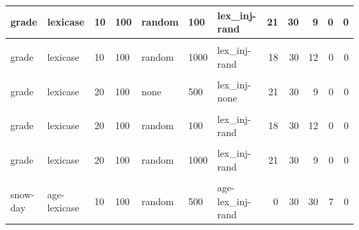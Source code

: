 \documentclass[
]{book}
\begin{document}
\begin{table}
\begin{tabular}{l|l|l|l|l|l|l|r|r|r|r|r}
\hline
grade & lexicase & 10 & 100 & random & 100 & lex\_inj-rand & 21 & 30 & 9 & 0 & 0\\
\hline
\cellcolor{gray!6}{grade} & \cellcolor{gray!6}{lexicase} & \cellcolor{gray!6}{10} & \cellcolor{gray!6}{100} & \cellcolor{gray!6}{random} & \cellcolor{gray!6}{500} & \cellcolor{gray!6}{lex\_inj-rand} & \cellcolor{gray!6}{23} & \cellcolor{gray!6}{30} & \cellcolor{gray!6}{7} & \cellcolor{gray!6}{0} & \cellcolor{gray!6}{0}\\
\hline
grade & lexicase & 10 & 100 & random & 1000 & lex\_inj-rand & 18 & 30 & 12 & 0 & 0\\
\hline
\cellcolor{gray!6}{grade} & \cellcolor{gray!6}{lexicase} & \cellcolor{gray!6}{20} & \cellcolor{gray!6}{100} & \cellcolor{gray!6}{none} & \cellcolor{gray!6}{100} & \cellcolor{gray!6}{lex\_inj-none} & \cellcolor{gray!6}{23} & \cellcolor{gray!6}{30} & \cellcolor{gray!6}{7} & \cellcolor{gray!6}{0} & \cellcolor{gray!6}{0}\\
\hline
grade & lexicase & 20 & 100 & none & 500 & lex\_inj-none & 21 & 30 & 9 & 0 & 0\\
\hline
\cellcolor{gray!6}{grade} & \cellcolor{gray!6}{lexicase} & \cellcolor{gray!6}{20} & \cellcolor{gray!6}{100} & \cellcolor{gray!6}{none} & \cellcolor{gray!6}{1000} & \cellcolor{gray!6}{lex\_inj-none} & \cellcolor{gray!6}{16} & \cellcolor{gray!6}{30} & \cellcolor{gray!6}{14} & \cellcolor{gray!6}{0} & \cellcolor{gray!6}{0}\\
\hline
grade & lexicase & 20 & 100 & random & 100 & lex\_inj-rand & 18 & 30 & 12 & 0 & 0\\
\hline
\cellcolor{gray!6}{grade} & \cellcolor{gray!6}{lexicase} & \cellcolor{gray!6}{20} & \cellcolor{gray!6}{100} & \cellcolor{gray!6}{random} & \cellcolor{gray!6}{500} & \cellcolor{gray!6}{lex\_inj-rand} & \cellcolor{gray!6}{24} & \cellcolor{gray!6}{30} & \cellcolor{gray!6}{6} & \cellcolor{gray!6}{0} & \cellcolor{gray!6}{0}\\
\hline
grade & lexicase & 20 & 100 & random & 1000 & lex\_inj-rand & 21 & 30 & 9 & 0 & 0\\
\hline
\cellcolor{gray!6}{snow-day} & \cellcolor{gray!6}{age-lexicase} & \cellcolor{gray!6}{10} & \cellcolor{gray!6}{100} & \cellcolor{gray!6}{random} & \cellcolor{gray!6}{100} & \cellcolor{gray!6}{age-lex\_inj-rand} & \cellcolor{gray!6}{0} & \cellcolor{gray!6}{30} & \cellcolor{gray!6}{30} & \cellcolor{gray!6}{9} & \cellcolor{gray!6}{0}\\
\hline
snow-day & age-lexicase & 10 & 100 & random & 500 & age-lex\_inj-rand & 0 & 30 & 30 & 7 & 0\\

\end{tabular}
\end{table}
\end{document}
